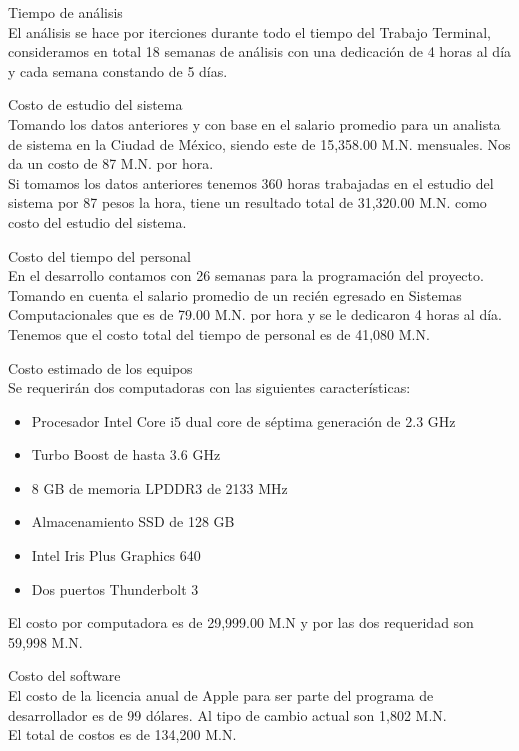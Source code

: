 	\begin{Citemize} 
		\item Tiempo de análisis\\
			El análisis se hace por iterciones durante todo el tiempo del Trabajo Terminal, consideramos en total 18 semanas de análisis con una dedicación de 4 horas al día y cada semana constando de 5 días.\\
			
		\item Costo de estudio del sistema\\
			Tomando los datos anteriores y con base en el salario promedio para un analista de sistema en la Ciudad de México, siendo este de 15,358.00 M.N. mensuales. \cite{17} Nos da un costo de 87 M.N. por hora.\\
			Si tomamos los datos anteriores tenemos 360 horas trabajadas en el estudio del sistema por 87 pesos la hora, tiene un resultado total de 31,320.00 M.N. como costo del estudio del sistema.\\
			
		\item Costo del tiempo del personal\\
			En el desarrollo contamos con 26 semanas para la programación del proyecto. Tomando en cuenta el salario promedio de un recién egresado en Sistemas Computacionales que es de 79.00 M.N. por hora y se le dedicaron 4 horas al día. \cite{18} Tenemos que el costo total del tiempo de personal es de 41,080 M.N.\\
			
		\item Costo estimado de los equipos\\
		Se requerirán dos computadoras con las siguientes características:
			\begin{itemize}
				\item Procesador Intel Core i5 dual core de séptima generación de 2.3 GHz
				\item Turbo Boost de hasta 3.6 GHz
				\item 8 GB de memoria LPDDR3 de 2133 MHz
				\item Almacenamiento SSD de 128 GB
				\item Intel Iris Plus Graphics 640
				\item Dos puertos Thunderbolt 3
			\end{itemize}
		El costo por computadora es de 29,999.00 M.N y por las dos requeridad son 59,998 M.N.
		
		\item Costo del software\\
		El costo de la licencia anual de Apple para ser parte del programa de desarrollador es de 99 dólares. Al tipo de cambio actual son 1,802 M.N.\\
		
		El total de costos es de 134,200 M.N.
		
	\end{Citemize}

